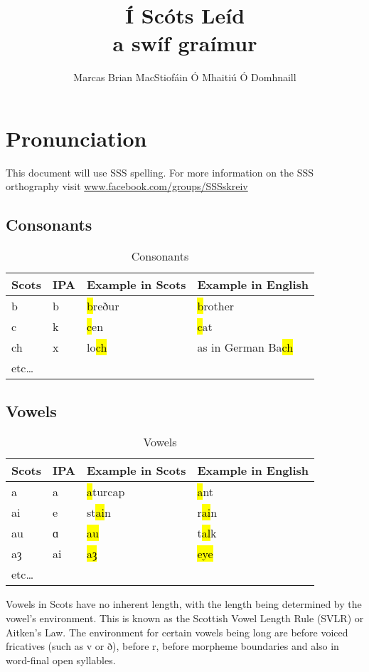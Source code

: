 \documentclass{article}
\author{Marcas Brian MacStiofáin Ó Mhaitiú Ó Domhnaill}
\title{\Huge{}Í Scóts Leíd\\\LARGE{}a swíf graímur}
\date{}
\newcommand{\hlv}[2][gray]{{\sethlcolor{#1}\hl{#2}}}
\begin{document}
\maketitle
\newpage
\tableofcontents
\listoftables
\newpage
\section{Pronunciation}
This document will use SSS spelling. For more information on the SSS orthography visit
\url{www.facebook.com/groups/SSSskreiv}
\subsection{Consonants}

\begin{table}[H]
\centering
\begin{tabular}{l|l|l|l}
    Scots&IPA&Example in Scots&Example in English\\\hline
    b&b&\hlv{b}reður&\hlv{b}rother\\
    c&k&\hlv{c}en&\hlv{c}at\\
    ch&x&lo\hlv{ch}&as in German Ba\hlv{ch}\\
    etc\dots&&&
\end{tabular}
\caption{Consonants}
\label{cons}
\end{table}

\subsection{Vowels}

\begin{table}[H]
\centering
\begin{tabular}{l|l|l|l}
    Scots&IPA&Example in Scots&Example in English\\\hline
    a&a&\hlv{a}turcap&\hlv{a}nt\\
    ai&e&st\hlv{ai}n&r\hlv{ai}n\\
    au&ɑ&\hlv{au}&t\hlv{al}k\\
    aȝ&ai&\hlv{aȝ}&\hlv{eye}\\
    etc\dots&&&
\end{tabular}
\caption{Vowels}
\label{vow}
\end{table}

Vowels in Scots have no inherent length, with the length being determined by the vowel's
environment. This is known as the Scottish Vowel Length Rule (SVLR) or Aitken's Law. The environment
for certain vowels being long are before voiced fricatives (such as v or ð), before r, before
morpheme boundaries and also in word-final open syllables.
\end{document}
